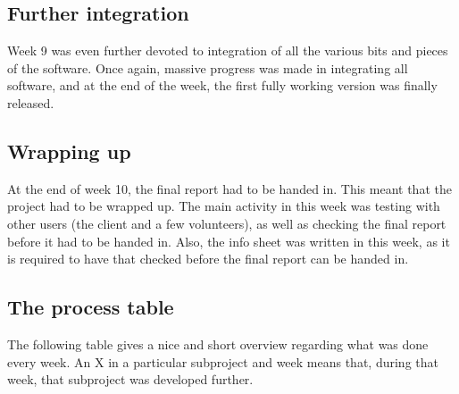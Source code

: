 		\subsection{Further integration}
			Week 9 was even further devoted to integration of all the various bits and
			pieces of the software. Once again, massive progress was made in
			integrating all software, and at the end of the week, the first fully
			working version was finally released. 
		 
		\subsection{Wrapping up}
			At the end of week 10, the final report had to be handed in. This meant
			that the project had to be wrapped up. The main activity in this week
			was testing with other users (the client and a few volunteers), as
			well as checking the final report before it had to be handed in.
			Also, the info sheet was written in this week, as it is required
			to have that checked before the final report can be handed in.
					 
		\subsection{The process table} \label{ssec:processtable}
			The following table gives a nice and short overview regarding what was done
			every week. An X in a particular subproject and week means that, during that
			week, that subproject was developed further.
			
